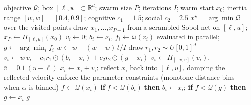 \begin{algorithm}[H]
\caption{\textsc{Pso}: particle swarm minimisation of $\mathcal{Q}$ over a box}
\label{alg:pso}
\begin{algorithmic}[1]
\Require objective $\mathcal{Q}$; box $[\ell,u]\subset\mathbb{R}^{d}$; swarm size
  $P$; iterations $I$; warm start $x_0$; inertia range
  $[\underline{w},\overline{w}]=[0.4,0.9]$; cognitive $c_1=1.5$; social $c_2=2.5$
\Ensure $x^\star=\arg\min \mathcal{Q}$ over the visited points
\State draw $x_1,\dots,x_{P-1}$ from a scrambled Sobol net on $[\ell,u]$;\;
  $x_P\gets\Pi_{[\ell,u]}(x_0)$
\State $v_i\gets 0$; \; $b_i\gets x_i$, $f_i\gets\mathcal{Q}(x_i)$ evaluated in
  parallel; \; $g\gets\arg\min_i f_i$
    \State $w\gets\overline{w}-(\overline{w}-\underline{w})\,t/I$
        \State draw $r_1,r_2\sim U[0,1]^d$
        \State $v_i\gets w\,v_i+c_1 r_1\odot(b_i-x_i)+c_2 r_2\odot(g-x_i)$
        \State $v_i\gets\Pi_{[-\bar v,\bar v]}(v_i)$, \; $\bar v=0.1\,(u-\ell)$
        \State $x_i\gets x_i+v_i$; reflect $x_i$ back into $[\ell,u]$, damping the
          reflected velocity
        \State enforce the parameter constraints (monotone distance bins when
          $\alpha$ is binned)
        \State $f\gets\mathcal{Q}(x_i)$
        \State \textbf{if} $f<\mathcal{Q}(b_i)$ \textbf{then} $b_i\gets x_i$;\;
          \textbf{if} $f<\mathcal{Q}(g)$ \textbf{then} $g\gets x_i$
    \EndFor
\EndFor
\State \Return $g$
\end{algorithmic}
\end{algorithm}

